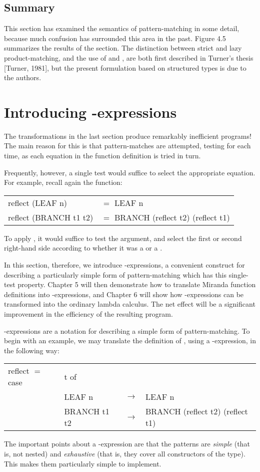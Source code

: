 \subsection{Summary}
This section has examined the semantics of pattern-matching in some detail, because much confusion has surrounded this area in the past. Figure 4.5 summarizes the results of the section. The distinction between strict and lazy product-matching, and the use of \ml{\fatbar} and , are both first described in Turner's thesis [Turner, 1981], but the present formulation based on structured types is due to the authors.

\section{Introducing -expressions}
The transformations in the last section produce remarkably inefficient programs! The main reason for this is that pattern-matches are attempted, testing for  each time, as each equation in the function definition is tried in turn.

Frequently, however, a single test would suffice to select the appropriate equation. For example, recall again the  function:
\begin{mlcoded}
    \begin{tabular}{ll}
    reflect (LEAF n) &$=$ LEAF n \\
    reflect (BRANCH t1 t2) &$=$ BRANCH (reflect t2) (reflect t1)
    \end{tabular}
\end{mlcoded}
To apply , it would suffice to test the argument, and select the first or second right-hand side according to whether it was a  or a .

In this section, therefore, we introduce -expressions, a convenient construct for describing a particularly simple form of pattern-matching which has this single-test property. Chapter 5 will then demonstrate how to translate Miranda function definitions into -expressions, and Chapter 6 will show how -expressions can be transformed into the ordinary lambda calculus. The net effect will be a significant improvement in the efficiency of the resulting program.

-expressions are a notation for describing a simple form of pattern-matching. To begin with an example, we may translate the definition of , using a -expression, in the following way:
\begin{mlcoded}
    \begin{tabular}{llll}
    reflect $=$ \tlb{t}case &t of \\
    &LEAF n  &$\rightarrow$  &LEAF n \\
    &BRANCH t1 t2 &$\rightarrow$ &BRANCH (reflect t2) (reflect t1)
    \end{tabular}
\end{mlcoded}
The important points about a -expression are that the patterns are \textit{simple} (that is, not nested) and \textit{exhaustive} (that is, they cover all constructors of the type). This makes them particularly simple to implement.

